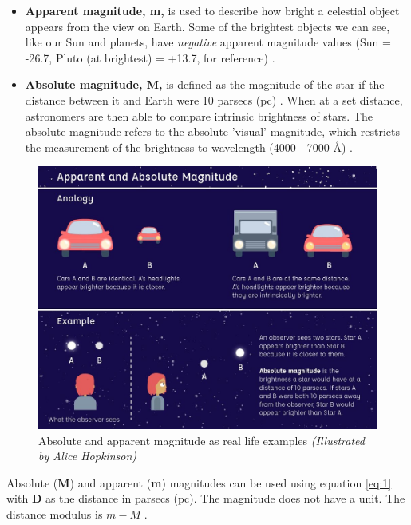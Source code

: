 \documentclass[12pt]{article}
\begin{document}
\begin{itemize}
    \item \textbf{Apparent magnitude, m,} is used to describe how bright a celestial object appears from the view on Earth. Some of the brightest objects we can see,
    like our Sun and planets, have \textit{negative} apparent magnitude values (Sun = -26.7, Pluto (at brightest) = +13.7, for reference)
    \cite{lcomag}.
    \item \textbf{Absolute magnitude, M,} is defined as the magnitude of the star if the distance between it and Earth were 10 parsecs (pc)
    \cite{lcoabsmag,cosmosabsmag}.
    When at a set distance, astronomers are then able to compare intrinsic brightness of stars. The absolute magnitude refers to the absolute 'visual' magnitude, which restricts
    the measurement of the brightness to wavelength (4000 - 7000 Å)
    \cite{cosmosabsmag}.
\end{itemize}

\begin{figure}[H]
    \centering
    \includegraphics[width=15cm]{lcomag.jpg}
    \caption{\centering \footnotesize{Absolute and apparent magnitude as real life examples \protect\cite{lcoabsmag} \textit{(Illustrated by Alice Hopkinson)}}}
    \label{fig:absappmag}
\end{figure}

Absolute (\textbf{M}) and apparent (\textbf{m}) magnitudes can be used using equation \ref{eq:1} with \textbf{D} as the distance in parsecs (pc). The magnitude does not have a unit.
The distance modulus is $m - M$
\cite{cosmosabsmag}.
\end{document}
